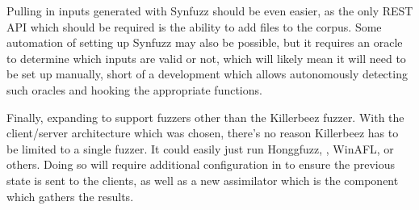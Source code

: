 Pulling in inputs generated with Synfuzz should be even easier, as the only
REST API which should be required is the ability to add files to the corpus.
Some automation of setting up Synfuzz may also be possible, but it requires an
oracle to determine which inputs are valid or not, which will likely mean it
will need to be set up manually, short of a development which allows
autonomously detecting such oracles and hooking the appropriate functions.

Finally, expanding to support fuzzers other than the Killerbeez fuzzer. With
the client/server architecture which was chosen, there's no reason Killerbeez
has to be limited to a single fuzzer.  It could easily just run Honggfuzz,
\AFL{}, WinAFL, or others.  Doing so will require additional configuration in
\BOINC{} to ensure the previous state is sent to the \BOINC{} clients, as well
as a new assimilator which is the \BOINC{} component which gathers the results.







